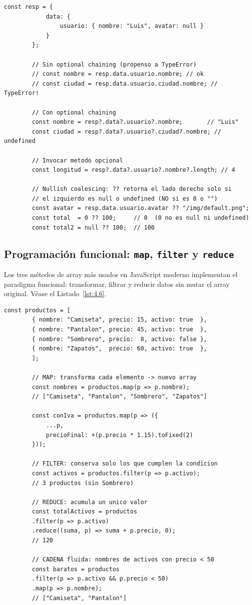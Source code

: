 \documentclass[11pt,a4paper,openany]{book}
\begin{document}
	\begin{lstlisting}[style=js,numbers=none,caption={Optional chaining (\texttt{?.}) y
			nullish coalescing (\texttt{??})},label=lst:4.5]
		const resp = {
			data: {
				usuario: { nombre: "Luis", avatar: null }
			}
		};
		
		// Sin optional chaining (propenso a TypeError)
		// const nombre = resp.data.usuario.nombre; // ok
		// const ciudad = resp.data.usuario.ciudad.nombre; // TypeError!
		
		// Con optional chaining
		const nombre = resp?.data?.usuario?.nombre;       // "Luis"
		const ciudad = resp?.data?.usuario?.ciudad?.nombre; // undefined
		
		// Invocar metodo opcional
		const longitud = resp?.data?.usuario?.nombre?.length; // 4
		
		// Nullish coalescing: ?? retorna el lado derecho solo si
		// el izquierdo es null o undefined (NO si es 0 o "")
		const avatar = resp.data.usuario.avatar ?? "/img/default.png";
		const total  = 0 ?? 100;     // 0  (0 no es null ni undefined)
		const total2 = null ?? 100;  // 100
	\end{lstlisting}
	
	\subsection{Programación funcional: \texttt{map}, \texttt{filter} y
		\texttt{reduce}}
	\label{sub:4.functional}
	
	Los tres métodos de array más usados en JavaScript moderno
	implementan el paradigma funcional: transformar, filtrar y
	reducir datos sin mutar el array original. Véase el
	Listado~\ref{lst:4.6}.
	
	\begin{lstlisting}[style=js,caption={Funciones de orden superior sobre arrays},
		label=lst:4.6]
		const productos = [
		{ nombre: "Camiseta", precio: 15, activo: true  },
		{ nombre: "Pantalon", precio: 45, activo: true  },
		{ nombre: "Sombrero", precio:  8, activo: false },
		{ nombre: "Zapatos",  precio: 60, activo: true  },
		];
		
		// MAP: transforma cada elemento -> nuevo array
		const nombres = productos.map(p => p.nombre);
		// ["Camiseta", "Pantalon", "Sombrero", "Zapatos"]
		
		const conIva = productos.map(p => ({
			...p,
			precioFinal: +(p.precio * 1.15).toFixed(2)
		}));
		
		// FILTER: conserva solo los que cumplen la condicion
		const activos = productos.filter(p => p.activo);
		// 3 productos (sin Sombrero)
		
		// REDUCE: acumula un unico valor
		const totalActivos = productos
		.filter(p => p.activo)
		.reduce((suma, p) => suma + p.precio, 0);
		// 120
		
		// CADENA fluida: nombres de activos con precio < 50
		const baratos = productos
		.filter(p => p.activo && p.precio < 50)
		.map(p => p.nombre);
		// ["Camiseta", "Pantalon"]
	\end{lstlisting}
	
\end{document}
